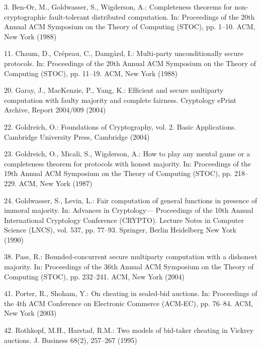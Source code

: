 \documentclass[letterpaper,11pt]{article}
\begin{document}
\begin{thebibliography}{15}
	 3. Ben-Or, M., Goldwasser, S., Wigderson, A.: Completeness theorems for non-cryptographic fault-tolerant
	distributed computation. In: Proceedings of the 20th Annual ACM Symposium on the Theory of Computing (STOC), pp. 1–10. ACM, New York (1988)

 	 11. Chaum, D., Crépeau, C., Damgård, I.: Multi-party unconditionally secure protocols. In: Proceedings of the 20th Annual ACM
	Symposium on the Theory of Computing (STOC), pp. 11–19. ACM, New York (1988)

 	 20. Garay, J., MacKenzie, P., Yang, K.: Efﬁcient and secure multiparty computation with faulty majority and complete fairness.
	Cryptology ePrint Archive, Report 2004/009 (2004)

 	 22. Goldreich, O.: Foundations of Cryptography, vol. 2. Basic Applications. Cambridge University Press, Cambridge (2004)

 	 23. Goldreich, O., Micali, S., Wigderson, A.: How to play any mental game or a completeness theorem for protocols with honest
	majority. In: Proceedings of the 19th Annual ACM Symposium on the Theory of Computing (STOC), pp. 218–229. ACM, New York (1987)

 	 24. Goldwasser, S., Levin, L.: Fair computation of general functions in presence of immoral majority. In: Advances in Cryptology—
	Proceedings of the 10th Annual International Cryptology Conference (CRYPTO). Lecture Notes in Computer Science (LNCS), vol. 537, pp. 77–93.
	Springer, Berlin Heidelberg New York (1990)

 	 38. Pass, R.: Bounded-concurrent secure multiparty computation with a dishonest majority. In: Proceedings of the 36th Annual ACM
	Symposium on the Theory of Computing (STOC), pp. 232–241. ACM, New York (2004)

 	 41. Porter, R., Shoham, Y.: On cheating in sealed-bid auctions. In: Proceedings of the 4th ACM Conference on Electronic Commerce
	(ACM-EC), pp. 76–84. ACM, New York (2003)

 	 42. Rothkopf, M.H., Harstad, R.M.: Two models of bid-taker cheating in Vickrey auctions. J. Business 68(2), 257–267 (1995)
\end{thebibliography}
\end{document}
